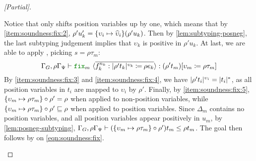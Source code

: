 \begin{proof}[{[Partial]}]
\begin{enumerate}
\begin{itemize}
\begin{itemize}
      \end{itemize}
      Notice that \shift only shifts position variables up by one, which means that by \ref{item:soundness:fix:2}, $\rho'u'_k = \{\upsilon_i \mapsto \widehat{\upsilon}_i\}(\rho'u_k)$.
      Then by \autoref{lem:subtyping-posneg}, the last subtyping judgement implies that $\upsilon_k$ is positive in $\rho' u_k$.
      At last, we are able to apply , picking $s = \rho \tau_m$:
      \begin{equation}\label{eqn:soundness:fix}
        \Gamma_G, \rho \Gamma_{\Psi} \vdash \fix{m}{f_k^{n_k}}{|\rho' t_k|^{\upsilon_k}}{\rho e_k} : \subst{(\rho' t_m)}{\upsilon_m}{\rho \tau_m}
      \end{equation}
      By \ref{item:soundness:fix:3} and \ref{item:soundness:fix:4}, we have $\lvert\rho' t_i\rvert^{\upsilon_i} = \lvert t_i\rvert^*$,
      as all position variables in $t_i$ are mapped to $\upsilon_i$ by $\rho'$.
      Finally, by \ref{item:soundness:fix:5}, $\{\upsilon_m \mapsto \rho \tau_m\} \circ \rho' = \rho$ when applied to non-position variables,
      while $\{\upsilon_m \mapsto \rho \tau_m\} \circ \rho' \sqsubseteq \rho$ when applied to position variables.
      Since $\Delta_m$ contains no position variables, and all position variables appear positively in $u_m$, by \autoref{lem:posneg-subtyping},
      $\Gamma_G, \rho \Gamma_{\Psi} \vdash (\{\upsilon_m \mapsto \rho \tau_m\} \circ \rho') t_m \leq \rho t_m$.
      The goal then follows by  on \autoref{eqn:soundness:fix}.
  \end{itemize}
\end{enumerate}
\end{proof}

